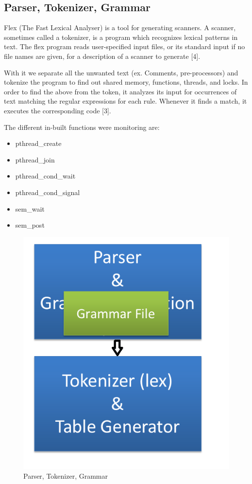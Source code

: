 \subsection{Parser, Tokenizer, Grammar}
Flex (The Fast Lexical Analyser) is a tool for generating scanners. A scanner, sometimes called a tokenizer, is a program which recognizes lexical patterns in text. The flex program reads user-specified input files, or its standard input if no file names are given, for a description of a scanner to generate [4].

With it we separate all the unwanted text (ex. Comments, pre-processors) and tokenize the program to find out shared memory, functions, threads, and locks. In order to find the above from the token, it analyzes its input for occurrences of text matching the regular expressions for each rule. Whenever it finds a match, it executes the corresponding code [3].

The different in-built functions were monitoring are:\\
\begin{itemize}
\item pthread\_create\\
\item pthread\_join\\
\item pthread\_cond\_wait\\
\item pthread\_cond\_signal\\
\item sem\_wait\\
\item sem\_post\\
\end{itemize}

\begin{figure}[H]
\centering
\includegraphics[scale=1]{grammar.png}
\caption{Parser, Tokenizer, Grammar}
\label{<<Label>>}
\end{figure}
\newpage
